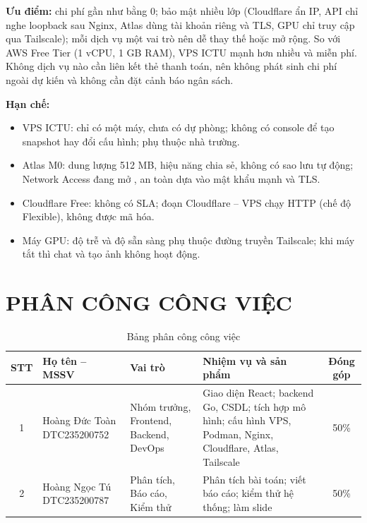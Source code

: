\documentclass[
a4paper,
fontsize=13pt,
DIV=calc,
oneside,
numbers=enddot,
captions=tableheading,
bibliography=totoc,
]{scrreprt}
\newcommand{\code}[1]{\texttt{\detokenize{#1}}}
\begin{document}
	\textbf{Ưu điểm:} chi phí gần như bằng 0; bảo mật nhiều lớp (Cloudflare ẩn IP, API chỉ nghe loopback sau Nginx, Atlas dùng tài khoản riêng và TLS, GPU chỉ truy cập qua Tailscale); mỗi dịch vụ một vai trò nên dễ thay thế hoặc mở rộng. So với AWS Free Tier (1 vCPU, 1 GB RAM), VPS ICTU mạnh hơn nhiều và miễn phí. Không dịch vụ nào cần liên kết thẻ thanh toán, nên không phát sinh chi phí ngoài dự kiến và không cần đặt cảnh báo ngân sách.
	
	\textbf{Hạn chế:}
	\begin{itemize}
		\item VPS ICTU: chỉ có một máy, chưa có dự phòng; không có console để tạo snapshot hay đổi cấu hình; phụ thuộc nhà trường.
		\item Atlas M0: dung lượng 512 MB, hiệu năng chia sẻ, không có sao lưu tự động; Network Access đang mở \code{0.0.0.0/0}, an toàn dựa vào mật khẩu mạnh và TLS.
		\item Cloudflare Free: không có SLA; đoạn Cloudflare -- VPS chạy HTTP (chế độ Flexible), không được mã hóa.
		\item Máy GPU: độ trễ và độ sẵn sàng phụ thuộc đường truyền Tailscale; khi máy tắt thì chat và tạo ảnh không hoạt động.
	\end{itemize}
	
	\chapter{PHÂN CÔNG CÔNG VIỆC}
	
	\begin{table}[H]
		\centering
		\caption{Bảng phân công công việc}\label{tab:phancong}
		\small
		\begin{tabularx}{\linewidth}{|c|p{3.1cm}|p{2.3cm}|L|c|}
			\hline
			\textbf{STT} & \textbf{Họ tên -- MSSV} & \textbf{Vai trò} & \textbf{Nhiệm vụ và sản phẩm} & \textbf{Đóng góp} \\  & Hoàng Đức Toàn \newline DTC235200752 & Nhóm trưởng, Frontend, Backend, DevOps & Giao diện React; backend Go, CSDL; tích hợp mô hình; cấu hình VPS, Podman, Nginx, Cloudflare, Atlas, Tailscale & 50\% \\  & Hoàng Ngọc Tú \newline DTC235200787 & Phân tích, Báo cáo, Kiểm thử & Phân tích bài toán; viết báo cáo; kiểm thử hệ thống; làm slide & 50\% \\ \hline
		\end{tabularx}
	\end{table}
	
\end{document}
